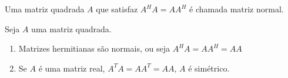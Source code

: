 \begin{definition}
	Uma matriz quadrada $A$ que satisfaz $A^HA = AA^H$ é chamada matriz normal.
\end{definition}

\begin{lemma}
	Seja $A$ uma matriz quadrada.
	\begin{enumerate}[label=(\roman*)]
		\item Matrizes hermitianas são normais, ou seja $A^HA = AA^H = AA$
		\item Se $A$ é uma matriz real, $A^TA = AA^T = AA$, $A$ é simétrico.
	\end{enumerate}
\end{lemma}
